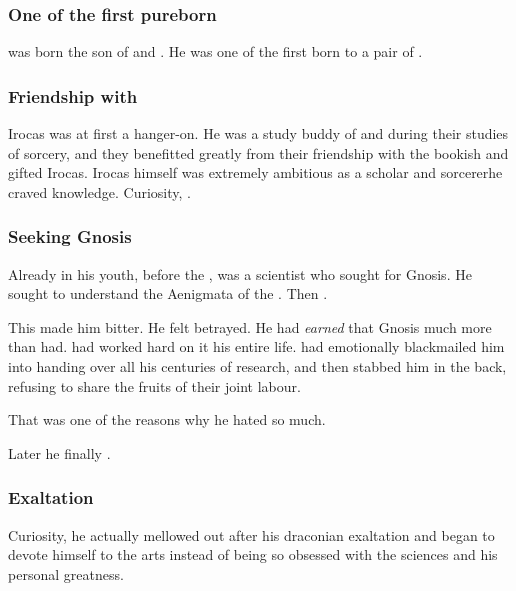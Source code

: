 \subsubsection{One of the first pureborn \dragons}
\Secherdamon was born the son of \Tiamat and \ApepNesthra. 
He was one of the first \ophidians born to a pair of \dragons. 





\subsubsection{Friendship with \Nexagglachel}
Irocas was at first a hanger-on. He was a study buddy of \Quessanth and \Raemyth during their studies of sorcery, and they benefitted greatly from their friendship with the bookish and gifted Irocas. Irocas himself was extremely ambitious as a scholar and sorcerer\dash{}he craved knowledge. 
Curiosity, .






\subsubsection{Seeking Gnosis}
Already in his youth, before the \secondbanewar, \Secherdamon{} was a scientist who sought for Gnosis. 
He sought to understand the Aenigmata of the \xss. 
Then .

This made him bitter. 
He felt betrayed. 
He had \emph{earned} that Gnosis much more than \Ishnaruchaefir{} had.
\Secherdamon{} had worked hard on it his entire life. 
\Ishnaruchaefir{} had emotionally blackmailed him into handing over all his centuries of research, and then stabbed him in the back, refusing to share the fruits of their joint labour. 

That was one of the reasons why he hated \Ishnaruchaefir{} so much. 

Later he finally . 





\subsubsection{Exaltation}
Curiosity, he actually mellowed out after his draconian exaltation and began to devote himself to the arts instead of being so obsessed with the sciences and his personal greatness. 






